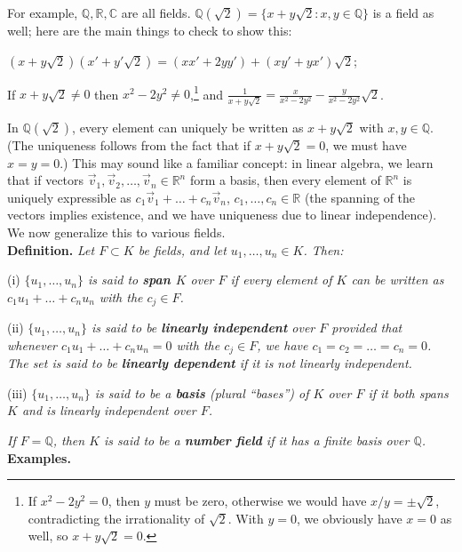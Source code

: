 \documentclass[leqno]{book}
\begin{document}
For example, $\mathbb Q,\mathbb R,\mathbb C$ are all fields.  $\mathbb Q(\sqrt 2)=\{x+y\sqrt 2:x,y\in\mathbb Q\}$ is a field as well; here are the main things to check to show this:
\begin{center}
$(x+y\sqrt 2)(x'+y'\sqrt 2)=(xx'+2yy')+(xy'+yx')\sqrt 2$;

If $x+y\sqrt 2\ne 0$ then $x^2-2y^2\ne 0$,\footnote{If $x^2-2y^2=0$, then $y$ must be zero, otherwise we would have $x/y=\pm\sqrt 2$, contradicting the irrationality of $\sqrt 2$.  With $y=0$, we obviously have $x=0$ as well, so $x+y\sqrt 2=0$.} and $\frac 1{x+y\sqrt 2}=\frac x{x^2-2y^2}-\frac y{x^2-2y^2}\sqrt 2$.
\end{center}
In $\mathbb Q(\sqrt 2)$, every element can uniquely be written as $x+y\sqrt 2$ with $x,y\in\mathbb Q$.  (The uniqueness follows from the fact that if $x+y\sqrt 2=0$, we must have $x=y=0$.)  This may sound like a familiar concept: in linear algebra, we learn that if vectors $\vec v_1,\vec v_2,\dots,\vec v_n\in\mathbb R^n$ form a basis, then every element of $\mathbb R^n$ is uniquely expressible as $c_1\vec v_1+\dots+c_n\vec v_n$, $c_1,\dots,c_n\in\mathbb R$ (the spanning of the vectors implies existence, and we have uniqueness due to linear independence).  We now generalize this to various fields.\\

\noindent\textbf{Definition.} \emph{Let $F\subset K$ be fields, and let $u_1,\dots,u_n\in K$.  Then:}

(i) \emph{$\{u_1,\dots,u_n\}$ is said to \textbf{span $K$} over $F$ if every element of $K$ can be written as $c_1u_1+\dots+c_nu_n$ with the $c_j\in F$.}

(ii) \emph{$\{u_1,\dots,u_n\}$ is said to be \textbf{linearly independent} over $F$ provided that whenever $c_1u_1+\dots+c_nu_n=0$ with the $c_j\in F$, we have $c_1=c_2=\dots=c_n=0$.  The set is said to be \textbf{linearly dependent} if it is not linearly independent.}

(iii) \emph{$\{u_1,\dots,u_n\}$ is said to be a \textbf{basis} (plural ``bases'') of $K$ over $F$ if it both spans $K$ and is linearly independent over $F$.}

\emph{If $F=\mathbb Q$, then $K$ is said to be a \textbf{number field} if it has a finite basis over $\mathbb Q$.}\\

\noindent\textbf{Examples.}
\end{document}
